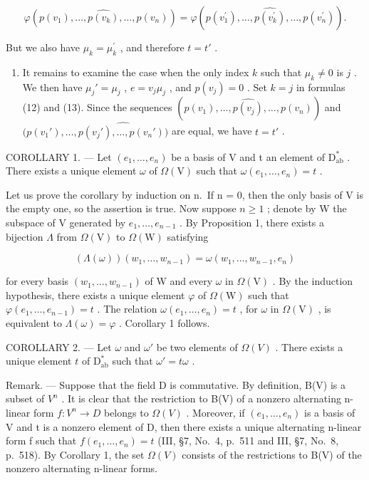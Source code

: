 \[
\varphi (p (v _ {1}), \dots , \widehat {p (v _ {k})}, \dots , p (v _ {n})) = \varphi (p (v _ {1} ^ {\prime}), \dots , \widehat {p (v _ {k} ^ {\prime})}, \dots , p (v _ {n} ^ {\prime})).
\]

But we also have \(\mu_{k} = \mu_{k}^{\prime}\) , and therefore \(t = t'\) .

\begin{enumerate}
\def\labelenumi{\alph{enumi})}
\setcounter{enumi}{2}
\tightlist
\item
  It remains to examine the case when the only index \(k\) such that \(\mu_k \neq 0\) is \(j\) . We then have \(\mu_j' = \mu_j\) , \(e = v_j\mu_j\) , and \(p(v_j) = 0\) . Set \(k = j\) in formulas (12) and (13). Since the sequences \((p(v_1), \ldots, \widehat{p(v_j)}, \ldots, p(v_n))\) and \((p(v_1'), \ldots, \widehat{p(v_j'), \ldots, p(v_n'))}\) are equal, we have \(t = t'\) .
\end{enumerate}

COROLLARY 1. --- Let \((e_1, \ldots, e_n)\) be a basis of V and t an element of \(\mathrm{D}_{\mathrm{ab}}^*\) . There exists a unique element \(\omega\) of \(\Omega(\mathrm{V})\) such that \(\omega(e_1, \ldots, e_n) = t\) .

Let us prove the corollary by induction on n.~If n = 0, then the only basis of V is the empty one, so the assertion is true. Now suppose \(n \geqslant 1\) ; denote by W the subspace of V generated by \(e_{1}, \ldots, e_{n-1}\) . By Proposition 1, there exists a bijection \(\Lambda\) from \(\Omega(\mathrm{V})\) to \(\Omega(\mathrm{W})\) satisfying

\[
(\Lambda (\omega)) (w _ {1}, \ldots , w _ {n - 1}) = \omega (w _ {1}, \ldots , w _ {n - 1}, e _ {n})
\]

for every basis \((w_{1},\ldots,w_{n-1})\) of W and every \(\omega\) in \(\Omega(\mathrm{V})\) . By the induction hypothesis, there exists a unique element \(\varphi\) of \(\Omega(\mathrm{W})\) such that \(\varphi(e_{1},\ldots,e_{n-1})=t\) . The relation \(\omega(e_{1},\ldots,e_{n})=t\) , for \(\omega\) in \(\Omega(\mathrm{V})\) , is equivalent to \(\Lambda(\omega)=\varphi\) . Corollary 1 follows.

COROLLARY 2. --- Let \(\omega\) and \(\omega'\) be two elements of \(\Omega(V)\) . There exists a unique element \(t\) of \(\mathrm{D}_{\mathrm{ab}}^{*}\) such that \(\omega' = t\omega\) .

Remark. --- Suppose that the field D is commutative. By definition, B(V) is a subset of \(V^{n}\) . It is clear that the restriction to B(V) of a nonzero alternating n-linear form \(f: V^{n} \to D\) belongs to \(\Omega(V)\) . Moreover, if \((e_{1}, \ldots, e_{n})\) is a basis of V and t is a nonzero element of D, then there exists a unique alternating n-linear form f such that \(f(e_{1}, \ldots, e_{n}) = t\) (III, §7, No.~4, p.~511 and III, §7, No.~8, p.~518). By Corollary 1, the set \(\Omega(V)\) consists of the restrictions to B(V) of the nonzero alternating n-linear forms.

